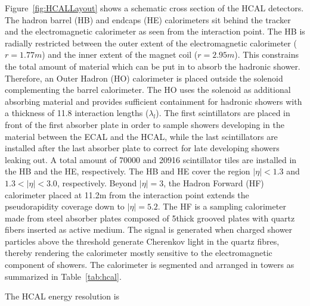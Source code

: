 Figure~\ref{fig:HCALLayout} shows a schematic cross section of the HCAL detectors. The hadron barrel (HB) and endcaps (HE) calorimeters sit behind the tracker and the electromagnetic calorimeter as seen from the interaction point. The HB is radially restricted between the outer extent of the electromagnetic calorimeter ($r = 1.77\unit{m}$) and the inner extent of the magnet coil ($r = 2.95\unit{m}$). This constrains the total amount of material which can be put in to absorb the hadronic shower. Therefore, an Outer Hadron (HO) calorimeter is placed outside the solenoid complementing the barrel calorimeter. The HO uses the solenoid as additional absorbing material and provides sufficient containment for hadronic showers with a thickness of 11.8 interaction lengths ($\lambda_l$). The first scintillators are placed in front of the first absorber plate in order to sample showers developing in the material between the ECAL and the HCAL, while the last scintillators are installed after the last absorber plate to correct for late developing showers leaking out. A total amount of 70000 and 20916 scintillator tiles are installed in the HB and the HE, respectively. The HB and HE cover the region $|\eta| < 1.3$ and $1.3 < |\eta| < 3.0$, respectively.  Beyond $|\eta| = 3$, the Hadron Forward (HF) calorimeter placed at 11.2\unit{m} from the interaction point extends the pseudorapidity coverage down to $|\eta| = 5.2$. The HF is a sampling calorimeter made from steel absorber plates composed of 5\mm thick grooved plates with quartz fibers inserted as active medium. The signal is generated when charged shower particles above the threshold generate Cherenkov light in the quartz fibres, thereby rendering the calorimeter mostly sensitive to the electromagnetic component of showers.
The calorimeter is segmented and arranged in towers as summarized in Table~\ref{tab:hcal}.

The HCAL energy resolution is 


